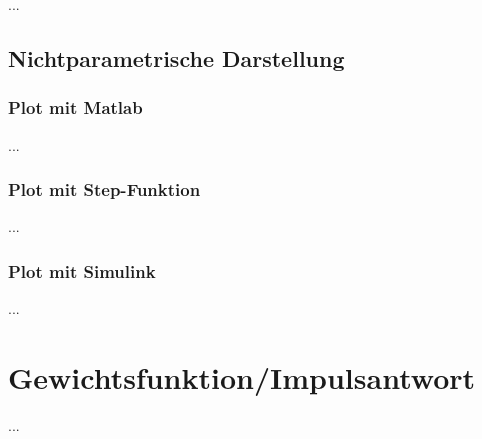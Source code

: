\documentclass[
  ngerman
  ,12pt
  ,pdftex
]{article}
\begin{document}
...
\subsection{Nichtparametrische Darstellung}
\subsubsection{Plot mit Matlab}
        
%
                    
...
\subsubsection{Plot mit Step-Funktion}
...
\subsubsection{Plot mit Simulink}
...

\section{Gewichtsfunktion/Impulsantwort} %
...
\end{document}
